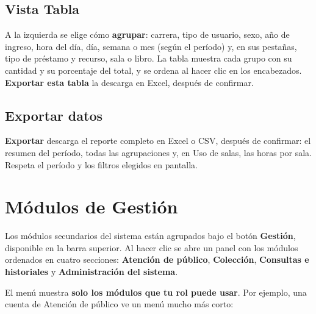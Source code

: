 \documentclass[11pt,a4paper]{report}
\begin{document}


\section{Vista Tabla}

A la izquierda se elige cómo \textbf{agrupar}: carrera, tipo de usuario,
sexo, año de ingreso, hora del día, día, semana o mes (según el
período) y, en sus pestañas, tipo
de préstamo y recurso, sala o libro. La tabla muestra cada grupo con su cantidad y su porcentaje del
total, y se ordena al hacer clic en los encabezados. \textbf{Exportar
esta tabla} la descarga en Excel, después de confirmar.


\section{Exportar datos}

\textbf{Exportar} descarga el reporte completo en Excel o CSV, después de
confirmar: el resumen del período, todas las agrupaciones y, en Uso de
salas, las horas por sala. Respeta el período y los filtros elegidos en
pantalla.

\chapter{Módulos de Gestión}
\label{cap:gestion}

Los módulos secundarios del sistema están agrupados bajo el botón
\textbf{Gestión}, disponible en la barra superior. Al hacer
clic se abre un panel con los módulos ordenados en cuatro secciones:
\textbf{Atención de público}, \textbf{Colección}, \textbf{Consultas e
historiales} y \textbf{Administración del sistema}.


El menú muestra \textbf{solo los módulos que tu rol puede usar}. Por
ejemplo, una cuenta de Atención de público ve un menú mucho más corto:
\end{document}
